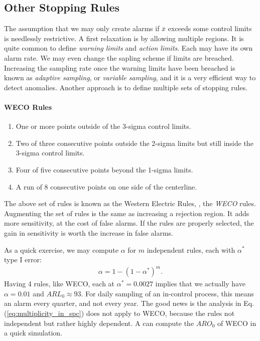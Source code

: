 \subsection{Other Stopping Rules}
\label{sec:stopping_rules}

The assumption that we may only create alarms if $\bar{x}$ exceeds some control limits is needlessly restrictive.
A first relaxation is by allowing multiple regions.
It is quite common to define \emph{warning limits} and \emph{action limits}. Each may have its own alarm rate.
We may even change the sapling scheme if limits are breached. Increasing the sampling rate once the warning limits have been breached is known as \emph{adaptive sampling}, or \emph{variable sampling}, and it is a very efficient way to detect anomalies. 
Another approach is to define multiple sets of stopping rules.
\begin{tcolorbox}[breakable]
\paragraph{WECO Rules}
\begin{enumerate}
\item One or more points outside of the 3-sigma control limits.
\item Two of three consecutive points outside the 2-sigma limits but still inside the 3-sigma control limits.
\item Four of five consecutive points beyond the 1-sigma limits.
\item A run of 8 consecutive points on one side of the centerline.
\end{enumerate}
\end{tcolorbox}

The above set of rules is known as the Western Electric Rules, \aka, the \emph{WECO} rules.
Augmenting the set of rules is the same as increasing a rejection region. It adds more sensitivity, at the cost of false alarms. If the rules are properly selected, the gain in sensitivity is worth the increase in false alarms.

As a quick exercise, we may compute $\alpha$  for $m$ independent rules, each with $\alpha^*$ type I error:
\begin{align}
\label{eq:multiplicity_in_spc}
	\alpha=1-(1-\alpha^*)^m.
\end{align}
Having 4 rules, like WECO, each at $\alpha^*=0.0027$ implies that we actually have $\alpha=0.01$ and $ARL_0 \approx 93$. For daily sampling of an in-control process, this means an alarm every quarter, and not every year. 
The good news is the analysis in Eq.(\ref{eq:multiplicity_in_spc}) does not apply to WECO, because the rules not independent but rather highly dependent. 
A can compute the $ARO_0$ of WECO in a quick simulation.


